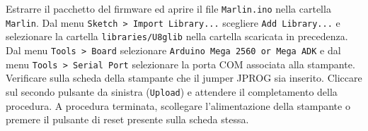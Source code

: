 \documentclass[12pt]{article}
\begin{document}
	Estrarre il pacchetto del firmware ed aprire il file \texttt{Marlin.ino} nella cartella \texttt{Marlin}. Dal menu \texttt{Sketch > Import Library...} scegliere \texttt{Add Library...} e selezionare la cartella	 \texttt{libraries/U8glib} nella cartella scaricata in precedenza.
	Dal menu \texttt{Tools > Board} selezionare \texttt{Arduino Mega 2560 or Mega ADK} e dal menu \texttt{Tools > Serial Port} selezionare la porta COM associata alla stampante. Verificare sulla scheda della stampante che il jumper JPROG sia inserito. Cliccare sul secondo pulsante da sinistra (\texttt{Upload}) e attendere il completamento della procedura. 
	A procedura terminata, scollegare l’alimentazione della stampante o premere il pulsante di reset presente sulla scheda stessa.
\end{document}
